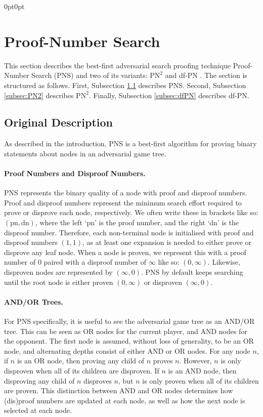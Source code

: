 \begingroup
\linespread{0.98}\selectfont
\begin{adjustwidth}{0pt}{0pt}
\section{Proof-Number Search}
\label{sec:PNS}
This section describes the best-first adversarial search proofing technique Proof-Number Search (PNS) \cite{Allis1994} and two of its variants: $\text{PN}^2$ \cite{Breuker1998} and df-PN \cite{Nagai2002}. The section is structured as follows. First, Subsection \ref{subsec:PNS} describes PNS. Second, Subsection \ref{subsec:PN2} describes ${\text{PN}}^2$. Finally, Subsection \ref{subsec:dfPN} describes df-PN.

\subsection{Original Description}
\label{subsec:PNS}
As described in the introduction, PNS \cite{Allis1994} is a best-first algorithm for proving binary statements about nodes in an adversarial game tree.

\paragraph{Proof Numbers and Disproof Numbers.} PNS represents the binary quality of a node with proof and disproof numbers. Proof and disproof numbers represent the minimum search effort required to prove or disprove each node, respectively. We often write these in brackets like so: $\left(\text{pn}, \text{dn}\right)$, where the left `pn' is the proof number, and the right `dn' is the disproof number.
Therefore, each non-terminal node is initialised with proof and disproof numbers $\left(1,1\right)$, as at least one expansion is needed to either prove or disprove any leaf node. 
When a node is proven, we represent this with a proof number of 0 paired with a disproof number of $\infty$ like so: $\left(0,\infty\right)$. Likewise, disproven nodes are represented by $\left(\infty, 0\right)$. PNS by default keeps searching until the root node is either proven $\left(0,\infty\right)$ or disproven $\left(\infty,0\right)$.

\paragraph{AND/OR Trees.} For PNS specifically, it is useful to see the adversarial game tree as an AND/OR tree. This can be seen as OR nodes for the current player, and AND nodes for the opponent.
The first node is assumed, without loss of generality, to be an OR node, and alternating depths consist of either AND or OR nodes. For any node $n$, if $n$ is an OR node, then proving any child of $n$ proves $n$. However, $n$ is only disproven when all of its children are disproven. If $n$ is an AND node, then disproving any child of $n$ disproves $n$, but $n$ is only proven when all of its children are proven. This distinction between AND and OR nodes determines how (dis)proof numbers are updated at each node, as well as how the next node is selected at each node.


\end{adjustwidth}
